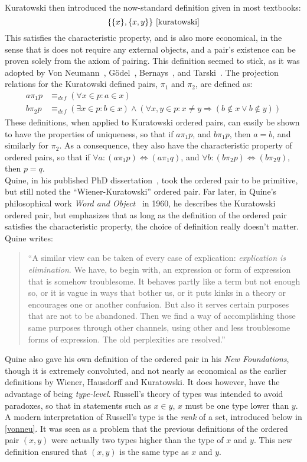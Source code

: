 \documentclass[11pt]{report}
\newcommand{\eqdef}{\equiv_\mathit{def}}
\newcommand{\pleft}{\mathrel{\pi_1}}
\newcommand{\pright}{\mathrel{\pi_2}}
\theoremstyle{definition}
\theoremstyle{theorem}
\theoremstyle{lemma}
\begin{document}
Kuratowski then introduced the now-standard definition given in most textbooks:
$$\{\{x\},\{x,y\}\}~\cite{kuratowski}$$
This satisfies the characteristic property, and is also more economical, in the sense that is does not require any external objects, and a pair's existence can be proven solely from the axiom of pairing.
This definition seemed to stick, as it was adopted by Von Neumann~\cite{von1961}, G\"odel~\cite{godel1992}, Bernays~\cite{bernays1937}, and Tarski~\cite{tarski1931}.  
The projection relations for the Kuratowski defined pairs, $\pleft$ and $\pright$, are defined as:
\begin{align*}
a\pleft p &\eqdef (\forall x\in p: a\in x) \\
b\pright p &\eqdef (\exists x\in p: b\in x) \wedge
                (\forall x,y \in p: x\neq y \Rightarrow (b\notin x \vee b\notin y))
\end{align*}
These definitions, when applied to Kuratowski ordered pairs, can easily be shown to have the properties of uniqueness, so that if $a\pleft p$, and $b\pleft p$, then $a=b$, and similarly for $\pright$. As a consequence, they also have the characteristic property of ordered pairs, so that if $\forall a: (a\pleft p)\Leftrightarrow(a\pleft q)$, and $\forall b: (b\pright p)\Leftrightarrow(b\pright q)$, then $p=q$.\\

Quine, in his published PhD dissertation~\cite{quine1934}, took the ordered pair to be primitive, but still noted the ``Wiener-Kuratowski'' ordered pair. 
Far later, in Quine's philosophical work \emph{Word and Object}~\cite{quineword} in 1960, he describes the Kuratowski ordered pair, but emphasizes that as long as the definition of the ordered pair satisfies the characteristic property, the choice of definition really doesn't matter. 
Quine writes: 
\begin{quotation}
``A similar view can be taken of every case of explication: \emph{explication
is elimination}. We have, to begin with, an expression or form of
expression that is somehow troublesome. It behaves partly like a
term but not enough so, or it is vague in ways that bother us, or it
puts kinks in a theory or encourages one or another confusion. But
also it serves certain purposes that are not to be abandoned. Then
we find a way of accomplishing those same purposes through other
channels, using other and less troublesome forms of expression.
The old perplexities are resolved.''
\end{quotation}
Quine also gave his own definition of the ordered pair in his \emph{New Foundations}, though it is extremely convoluted, and not nearly as economical as the earlier definitions by Wiener, Hausdorff and Kuratowski.
It does however, have the advantage of being \emph{type-level}. 
Russell's theory of types was intended to avoid paradoxes, so that in statements such as $x\in y$, $x$ must be one type lower than $y$. 
A modern interpretation of Russell's type is the \emph{rank} of a set, introduced below in \ref{vonneu}.
It was seen as a problem that the previous definitions of the ordered pair $(x,y)$ were actually two types higher than the type of $x$ and $y$.
This new definition ensured that $(x,y)$ is the same type as $x$ and $y$.
\end{document}
